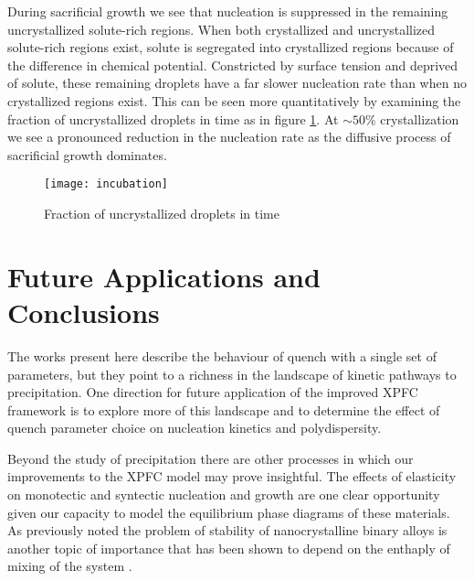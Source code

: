 
During sacrificial growth we see that nucleation is suppressed in the remaining
uncrystallized solute-rich regions. When both crystallized and uncrystallized
solute-rich regions exist, solute is segregated into crystallized regions
because of the difference in chemical potential. Constricted by surface tension
and deprived of solute, these remaining droplets have a far slower nucleation
rate than when no crystallized regions exist. This can be seen more
quantitatively by examining the fraction of uncrystallized droplets in time as
in figure \ref{fig:incubation}. At $\sim 50\%$ crystallization we see a
pronounced reduction in the nucleation rate as the diffusive process of
sacrificial growth dominates.

\begin{figure}
    \centering
    \texttt{[image: incubation]}
    \caption[Fraction of uncrystallized droplets in time]{
        \label{fig:incubation}
        Fraction of uncrystallized droplets in time
    }
\end{figure}

\section{Future Applications and Conclusions} %


The works present here describe the behaviour of quench with a single set of
parameters, but they point to a richness in the landscape of kinetic pathways to
precipitation. One direction for future application of the improved XPFC framework
is to explore more of this landscape and to determine the effect of quench parameter
choice on nucleation kinetics and polydispersity.


Beyond the study of precipitation there are other processes in which our improvements
to the XPFC model may prove insightful. The effects of elasticity on monotectic and 
syntectic nucleation and growth are one clear opportunity given our capacity to model
the equilibrium phase diagrams of these materials. As previously noted the problem
of stability of nanocrystalline binary alloys is another topic of importance that has 
been shown to depend on the enthaply of mixing of the system \cite{MURDOCH13}.


